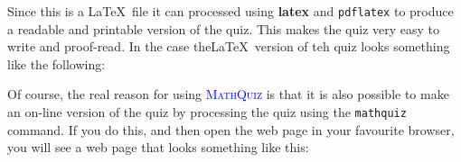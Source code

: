 \documentclass[svgnames]{article}
\def\MathQuiz{\textcolor{blue}{\textsc{MathQuiz}}\xspace}
\begin{document}
    

    Since this is a \LaTeX\ file it can processed using \textbf{latex}
    and \texttt{pdflatex} to produce a readable and printable version of
    the quiz. This makes the quiz very easy to write and proof-read. In
    the case the\LaTeX\ version of teh quiz looks something like the
    following:

    \begin{center}
    \end{center}


    Of course, the real reason for using \MathQuiz is that it is also
    possible to make an on-line version of the quiz by processing the
    quiz using the \texttt{mathquiz} command. If you do this, and then open
    the web page in your favourite browser, you will see a web page
    that looks something like this:

    \begin{center}
    \end{center}
\end{document}
